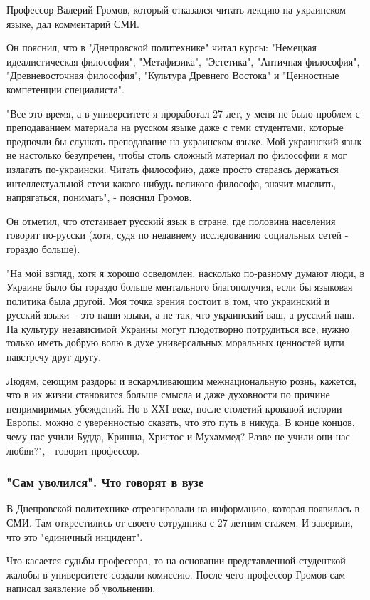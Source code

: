 Профессор Валерий Громов, который отказался читать лекцию на украинском языке,
дал комментарий СМИ. 

Он пояснил, что в "Днепровской политехнике" читал курсы: "Немецкая
идеалистическая философия", "Метафизика", "Эстетика", "Античная философия",
"Древневосточная философия", "Культура Древнего Востока" и "Ценностные
компетенции специалиста".

"Все это время, а в университете я проработал 27 лет, у меня не было проблем с
преподаванием материала на русском языке даже с теми студентами, которые
предпочли бы слушать преподавание на украинском языке. Мой украинский язык не
настолько безупречен, чтобы столь сложный материал по философии я мог излагать
по-украински. Читать философию, даже просто стараясь держаться интеллектуальной
стези какого-нибудь великого философа, значит мыслить, напрягаться, понимать",
- пояснил Громов.

Он отметил, что отстаивает русский язык в стране, где половина населения
говорит по-русски (хотя, судя по недавнему исследованию социальных сетей -
гораздо больше).

"На мой взгляд, хотя я хорошо осведомлен, насколько по-разному думают люди, в
Украине было бы гораздо больше ментального благополучия, если бы языковая
политика была другой. Моя точка зрения состоит в том, что украинский и русский
языки – это наши языки, а не так, что украинский ваш, а русский наш. На
культуру независимой Украины могут плодотворно потрудиться все, нужно только
иметь добрую волю в духе универсальных моральных ценностей идти навстречу друг
другу.

Людям, сеющим раздоры и вскармливающим межнациональную рознь, кажется, что в их
жизни становится больше смысла и даже духовности по причине непримиримых
убеждений. Но в ХХІ веке, после столетий кровавой истории Европы, можно с
уверенностью сказать, что это путь в никуда. В конце концов, чему нас учили
Будда, Кришна, Христос и Мухаммед? Разве не учили они нас любви?", - говорит
профессор.

\subsubsection{"Сам уволился". Что говорят в вузе}

В Днепровской политехнике отреагировали на информацию, которая появилась в СМИ.
Там открестились от своего сотрудника с 27-летним стажем. И заверили, что это
"единичный инцидент". 

Что касается судьбы профессора, то на основании представленной студенткой
жалобы в университете создали комиссию. После чего профессор Громов сам написал
заявление об увольнении. 

